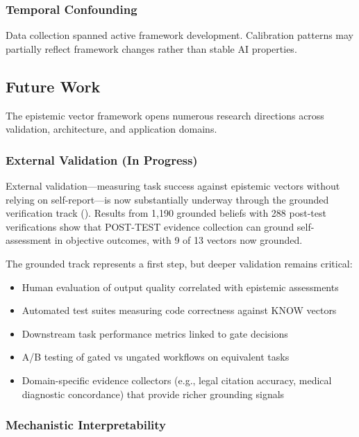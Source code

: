 \subsubsection{Temporal Confounding}

Data collection spanned active framework development. Calibration patterns may partially reflect framework changes rather than stable AI properties.

\subsection{Future Work}

The epistemic vector framework opens numerous research directions across validation, architecture, and application domains.

\subsubsection{External Validation (In Progress)}

External validation---measuring task success against epistemic vectors without relying on self-report---is now substantially underway through the grounded verification track (). Results from 1,190 grounded beliefs with 288 post-test verifications show that POST-TEST evidence collection can ground self-assessment in objective outcomes, with 9 of 13 vectors now grounded.

The grounded track represents a first step, but deeper validation remains critical:

\begin{itemize}
    \item Human evaluation of output quality correlated with epistemic assessments
    \item Automated test suites measuring code correctness against KNOW vectors
    \item Downstream task performance metrics linked to gate decisions
    \item A/B testing of gated vs ungated workflows on equivalent tasks
    \item Domain-specific evidence collectors (e.g., legal citation accuracy, medical diagnostic concordance) that provide richer grounding signals
\end{itemize}

\subsubsection{Mechanistic Interpretability}

